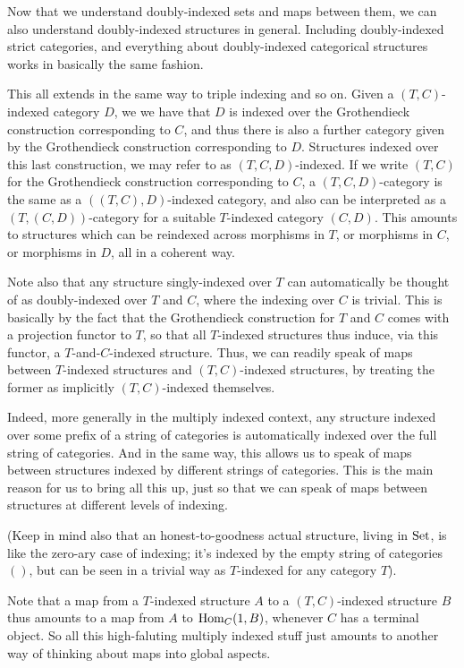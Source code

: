 Now that we understand doubly-indexed sets and maps between them, we can also understand doubly-indexed structures in general. Including doubly-indexed strict categories, and everything about doubly-indexed categorical structures works in basically the same fashion.

This all extends in the same way to triple indexing and so on. Given a $(T, C)$-indexed category $D$, we we have that $D$ is indexed over the Grothendieck construction corresponding to $C$, and thus there is also a further category given by the Grothendieck construction corresponding to $D$. Structures indexed over this last construction, we may refer to as $(T, C, D)$-indexed. If we write $(T, C)$ for the Grothendieck construction corresponding to $C$, a $(T, C, D)$-category is the same as a $((T, C), D)$-indexed category, and also can be interpreted as a $(T, (C, D))$-category for a suitable $T$-indexed category $(C, D)$. This amounts to structures which can be reindexed across morphisms in $T$, or  morphisms in $C$, or morphisms in $D$, all in a coherent way.


Note also that any structure singly-indexed over $T$ can automatically be thought of as doubly-indexed over $T$ and $C$, where the indexing over $C$ is trivial. This is basically by the fact that the Grothendieck construction for $T$ and $C$ comes with a projection functor to $T$, so that all $T$-indexed structures thus induce, via this functor, a $T$-and-$C$-indexed structure. Thus, we can readily speak of maps between $T$-indexed structures and $(T, C)$-indexed structures, by treating the former as implicitly $(T, C)$-indexed themselves.

Indeed, more generally in the multiply indexed context, any structure indexed over some prefix of a string of categories is automatically indexed over the full string of categories. And in the same way, this allows us to speak of maps between structures indexed by different strings of categories. This is the main reason for us to bring all this up, just so that we can speak of maps between structures at different levels of indexing.

(Keep in mind also that an honest-to-goodness actual structure, living in $\mathrm{Set}$, is like the zero-ary case of indexing; it's indexed by the empty string of categories $()$, but can be seen in a trivial way as $T$-indexed for any category $T$).

Note that a map from a $T$-indexed structure $A$ to a $(T, C)$-indexed structure $B$ thus amounts to a map from $A$ to $\operatorname{Hom}_C(1, B)$, whenever $C$ has a terminal object. So all this high-faluting multiply indexed stuff just amounts to another way of thinking about maps into global aspects.
